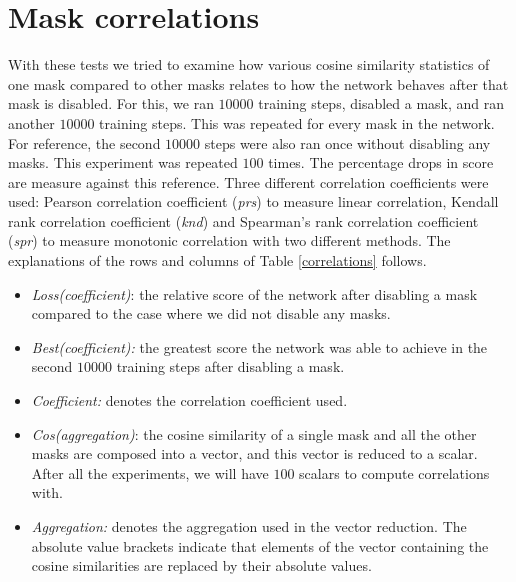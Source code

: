 \documentclass[12pt]{report}
\begin{document}
\section{Mask correlations}
With these tests we tried to examine how various cosine similarity statistics of one mask compared to other masks relates to how the network behaves after that mask is disabled. For this, we ran $10000$ training steps, disabled a mask, and ran another $10000$ training steps. This was repeated for every mask in the network. For reference, the second $10000$ steps were also ran once without disabling any masks. This experiment was repeated $100$ times. The percentage drops in score are measure against this reference. Three different correlation coefficients were used: Pearson correlation coefficient (\textit{prs}) \cite{prs} to measure linear correlation, Kendall rank correlation coefficient (\textit{knd}) \cite{knd} and Spearman's rank correlation coefficient (\textit{spr}) \cite{spr} to measure monotonic correlation with two different methods. The explanations of the rows and columns of Table \ref{correlations} follows.
\begin{itemize}
	\item \textit{Loss(coefficient)}: the relative score of the network after disabling a mask compared to the case where we did not disable any masks.
	
	\item\textit{Best(coefficient):} the greatest score the network was able to achieve in the second $10000$ training steps after disabling a mask.
	
	\item\textit{Coefficient:} denotes the correlation coefficient used.
	
	\item\textit{Cos(aggregation)}: the cosine similarity of a single mask and all the other masks are composed into a vector, and this vector is reduced to a scalar. After all the experiments, we will have $100$ scalars to compute correlations with.
	
	\item\textit{Aggregation:} denotes the aggregation used in the vector reduction. The absolute value brackets indicate that elements of the vector containing the cosine similarities are replaced by their absolute values.
\end{itemize}
\end{document}
